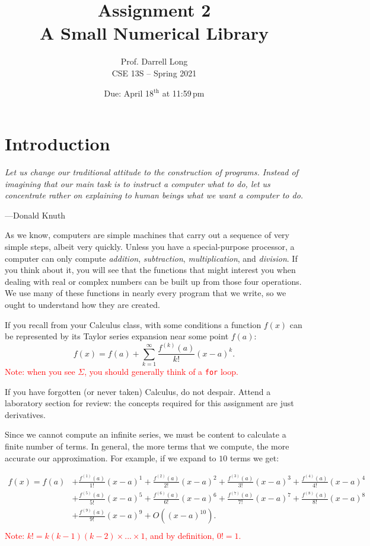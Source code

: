 \documentclass[11pt]{article}
\title{Assignment 2 \\ A Small Numerical Library}
\author{
  Prof. Darrell Long \\
  CSE 13S -- Spring 2021
}
\date{Due: April 18$^\text{th}$ at 11:59\,pm}
\newcommand{\taylorterm}[1]{\frac{f^{(#1)} (a)}{#1!}{(x-a)}^{#1}}
\begin{document}
\maketitle

\section{Introduction}

\textwidth
\epigraph{\emph{Let us change our traditional attitude to the construction of
programs. Instead of imagining that our main task is to instruct a computer what
to do, let us concentrate rather on explaining to human beings what we want a
computer to do.}} {---Donald Knuth}

\noindent As we know, computers are simple machines that carry out a sequence of
very simple steps, albeit very quickly. Unless you have a special-purpose
processor, a computer can only compute \emph{addition}, \emph{subtraction},
\emph{multiplication}, and \emph{division}. If you think about it, you will see
that the functions that might interest you when dealing with real or complex
numbers can be built up from those four operations.  We use many of these
functions in nearly every program that we write, so we ought to understand how
they are created.

If you recall from your Calculus class, with some conditions a function $f(x)$
can be represented by its Taylor series expansion near some point $f(a)$:
\[
  f(x) = f(a) + \sum_{k=1}^\infty \frac{f^{(k)}(a)}{k!}{(x-a)}^k.
\]
\textcolor{red}{Note: when you see $\Sigma$, you should generally think of a
\texttt{for} loop.}

If you have forgotten (or never taken) Calculus, do not despair. Attend a
laboratory section for review: the concepts required for this assignment are
just derivatives.

Since we cannot compute an infinite series, we must be content to calculate a
finite number of terms. In general, the more terms that we compute, the more
accurate our approximation. For example, if we expand to $10$ terms we get:

\begin{align*}
  f(x) = f(a) &+ \taylorterm{1} + \taylorterm{2} + \taylorterm{3} + \taylorterm{4} \\
              &+ \taylorterm{5} + \taylorterm{6} + \taylorterm{7} + \taylorterm{8} \\
              &+ \taylorterm{9} + O({(x-a)}^{10}). \\
\end{align*}
\textcolor{red}{Note: $k! = k(k-1)(k-2)\times...\times1$, and by definition, $0! = 1$. }
\end{document}
